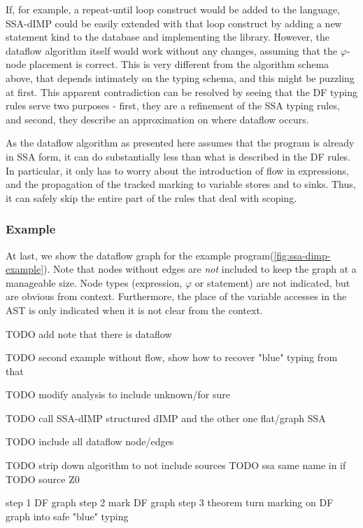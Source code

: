 If, for example, a repeat-until loop construct would be added to the language,
SSA-dIMP could be easily extended with that loop construct by adding a new statement 
kind to the database and implementing the library.
However, the dataflow algorithm itself would work without any changes, assuming that
the $\varphi$-node placement is correct.
This is very different from the algorithm schema above, that depends intimately on the 
typing schema, and this might be puzzling at first.
This apparent contradiction can be resolved by seeing that the DF typing 
rules serve two purposes - first, they are a refinement of the SSA typing rules,
and second, they describe an approximation on where dataflow occurs.

As the dataflow algorithm as presented here assumes that the program is already in 
SSA form, it can do substantially less than what is described in the DF rules.
In particular, it only has to worry about the introduction of flow in expressions,
and the propagation of the tracked marking to variable stores and to sinks.
Thus, it can safely skip the entire part of the rules that deal with scoping.

\subsubsection*{Example}
At last, we show the dataflow graph for the example program(\autoref{fig:ssa-dimp-example}).
Note that nodes without edges are \emph{not} included to keep the graph at a manageable size.
Node types (expression, $\varphi$ or statement) are not indicated, but are obvious from context.
Furthermore, the place of the variable accesses in the AST is only indicated when it is 
not clear from the context.

TODO add note that there is dataflow

TODO second example without flow, show how to recover "blue" typing from that

TODO modify analysis to include unknown/for sure 

TODO call SSA-dIMP structured dIMP and the other one flat/graph SSA

TODO include all dataflow node/edges

TODO strip down algorithm to not include sources
TODO ssa same name in if 
TODO source Z0

step 1 DF graph step 2 mark DF graph step 3 theorem turn marking on DF graph into safe "blue" typing

